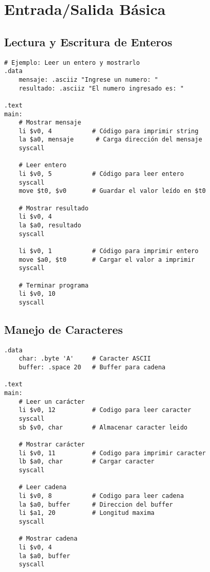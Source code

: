\documentclass{article}
\begin{document}
\section{Entrada/Salida Básica}

\subsection{Lectura y Escritura de Enteros}
\begin{lstlisting}[language={[mips]Assembler}]
# Ejemplo: Leer un entero y mostrarlo
.data
    mensaje: .asciiz "Ingrese un numero: "
    resultado: .asciiz "El numero ingresado es: "

.text
main:
    # Mostrar mensaje
    li $v0, 4           # Código para imprimir string
    la $a0, mensaje      # Carga dirección del mensaje
    syscall

    # Leer entero
    li $v0, 5           # Código para leer entero
    syscall
    move $t0, $v0       # Guardar el valor leído en $t0

    # Mostrar resultado
    li $v0, 4
    la $a0, resultado
    syscall

    li $v0, 1           # Código para imprimir entero
    move $a0, $t0       # Cargar el valor a imprimir
    syscall

    # Terminar programa
    li $v0, 10
    syscall
\end{lstlisting}

\subsection{Manejo de Caracteres}
\begin{lstlisting}[language={[mips]Assembler}]
.data
    char: .byte 'A'     # Caracter ASCII
    buffer: .space 20   # Buffer para cadena

.text
main:
    # Leer un carácter
    li $v0, 12          # Codigo para leer caracter
    syscall
    sb $v0, char        # Almacenar caracter leido

    # Mostrar carácter
    li $v0, 11          # Codigo para imprimir caracter
    lb $a0, char        # Cargar caracter
    syscall

    # Leer cadena
    li $v0, 8           # Codigo para leer cadena
    la $a0, buffer      # Direccion del buffer
    li $a1, 20          # Longitud maxima
    syscall

    # Mostrar cadena
    li $v0, 4
    la $a0, buffer
    syscall
\end{lstlisting}
\end{document}
